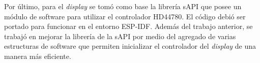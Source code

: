 Por último, para el \textit{display} se tomó como base la librería sAPI \citep{sAPI} que posee un módulo de software para utilizar el controlador HD44780. El código debió ser portado para funcionar en el entorno ESP-IDF. Además del trabajo anterior, se trabajó en mejorar la librería de la sAPI por medio del agregado de varias estructuras de software que permiten inicializar el controlador del \textit{display} de una manera más eficiente.

